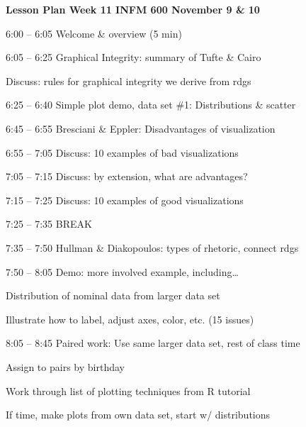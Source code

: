 \documentclass[]{article}
\date{}
\begin{document}
\textbf{Lesson Plan Week 11 INFM 600 November 9 \& 10 }

6:00 -- 6:05 Welcome \& overview (5 min)

6:05 -- 6:25 Graphical Integrity: summary of Tufte \& Cairo

Discuss: rules for graphical integrity we derive from rdgs

6:25 -- 6:40 Simple plot demo, data set \#1: Distributions \& scatter

6:45 -- 6:55 Bresciani \& Eppler: Disadvantages of visualization

6:55 -- 7:05 Discuss: 10 examples of bad visualizations

7:05 -- 7:15 Discuss: by extension, what are advantages?

7:15 -- 7:25 Discuss: 10 examples of good visualizations

7:25 -- 7:35 BREAK

7:35 -- 7:50 Hullman \& Diakopoulos: types of rhetoric, connect rdgs

7:50 -- 8:05 Demo: more involved example, including\ldots{}

Distribution of nominal data from larger data set

Illustrate how to label, adjust axes, color, etc. (15 issues)

8:05 -- 8:45 Paired work: Use same larger data set, rest of class time

Assign to pairs by birthday

Work through list of plotting techniques from R tutorial

If time, make plots from own data set, start w/ distributions
\end{document}
